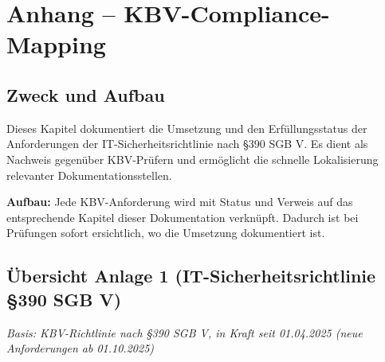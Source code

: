 \section{Anhang – KBV-Compliance-Mapping}
\label{sec:kbv-compliance}

\subsection*{Zweck und Aufbau}

Dieses Kapitel dokumentiert die Umsetzung und den Erfüllungsstatus der Anforderungen der
IT-Sicherheitsrichtlinie nach §390 SGB V. Es dient als Nachweis gegenüber KBV-Prüfern
und ermöglicht die schnelle Lokalisierung relevanter Dokumentationsstellen.

\textbf{Aufbau:} Jede KBV-Anforderung wird mit Status und Verweis auf das entsprechende
Kapitel dieser Dokumentation verknüpft. Dadurch ist bei Prüfungen sofort ersichtlich,
wo die Umsetzung dokumentiert ist.

\subsection*{Übersicht Anlage 1 (IT-Sicherheitsrichtlinie §390 SGB V)}

\textit{Basis: KBV-Richtlinie nach §390 SGB V, in Kraft seit 01.04.2025 (neue Anforderungen ab 01.10.2025)}

